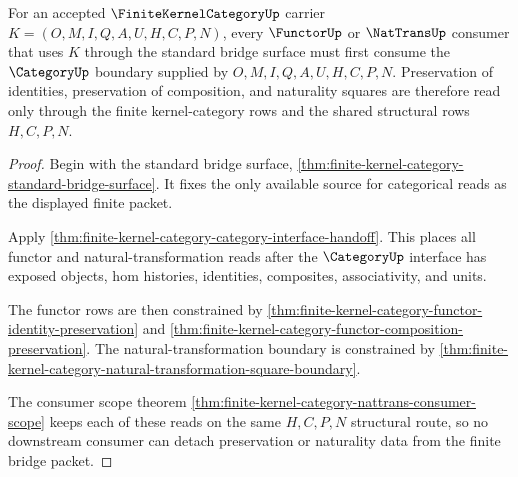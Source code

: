 \begin{theorem}
\label{thm:finite-kernel-category-functor-nattrans-bridge-boundary}
For an accepted $\FiniteKernelCategoryUp$ carrier
$K=(O,M,I,Q,A,U,H,C,P,N)$, every $\FunctorUp$ or $\NatTransUp$ consumer that
uses $K$ through the standard bridge surface must first consume the
$\CategoryUp$ boundary supplied by $O,M,I,Q,A,U,H,C,P,N$. Preservation of
identities, preservation of composition, and naturality squares are therefore
read only through the finite kernel-category rows and the shared structural
rows $H,C,P,N$.
\end{theorem}
\begin{proof}
Begin with the standard bridge surface,
\autoref{thm:finite-kernel-category-standard-bridge-surface}. It fixes the
only available source for categorical reads as the displayed finite packet.

Apply \autoref{thm:finite-kernel-category-category-interface-handoff}. This
places all functor and natural-transformation reads after the $\CategoryUp$
interface has exposed objects, hom histories, identities, composites,
associativity, and units.

The functor rows are then constrained by
\autoref{thm:finite-kernel-category-functor-identity-preservation} and
\autoref{thm:finite-kernel-category-functor-composition-preservation}. The
natural-transformation boundary is constrained by
\autoref{thm:finite-kernel-category-natural-transformation-square-boundary}.

The consumer scope theorem
\autoref{thm:finite-kernel-category-nattrans-consumer-scope} keeps each of
these reads on the same $H,C,P,N$ structural route, so no downstream consumer
can detach preservation or naturality data from the finite bridge packet.
\end{proof}

